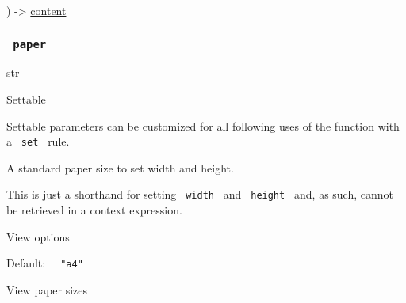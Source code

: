 ) -\textgreater{} \href{/docs/reference/foundations/content/}{content}

\subsubsection{\texorpdfstring{\texttt{\ paper\ }}{ paper }}\label{parameters-paper}

\href{/docs/reference/foundations/str/}{str}

{{ Settable }}

\label{parameters-paper-settable-tooltip}
Settable parameters can be customized for all following uses of the
function with a \texttt{\ set\ } rule.

A standard paper size to set width and height.

This is just a shorthand for setting \texttt{\ width\ } and
\texttt{\ height\ } and, as such, cannot be retrieved in a context
expression.


View options

Default: \texttt{\ }{\texttt{\ "a4"\ }}\texttt{\ }


View paper sizes

